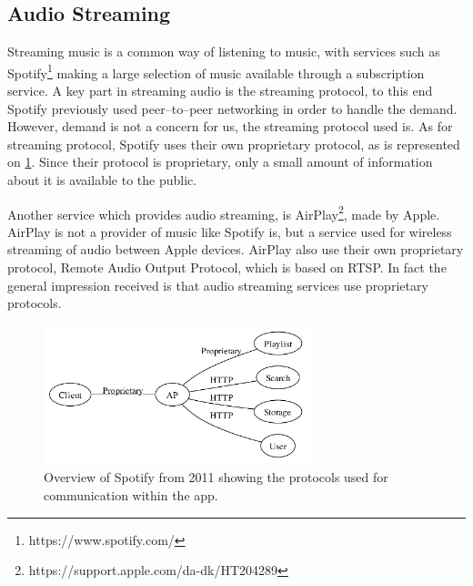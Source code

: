 \subsection{Audio Streaming}
Streaming music is a common way of listening to music, with services such as Spotify\footnote{https://www.spotify.com/} making a large selection of music available through a subscription service.
A key part in streaming audio is the streaming protocol, to this end Spotify previously used peer--to--peer networking in order to handle the demand.\cite{spotify1}
However, demand is not a concern for us, the streaming protocol used is.
As for streaming protocol, Spotify uses their own proprietary protocol, as is represented on \cref{fig:spotifyOverview}.\cite{spotifySlides} %
Since their protocol is proprietary, only a small amount of information about it is available to the public.

Another service which provides audio streaming, is AirPlay\footnote{https://support.apple.com/da-dk/HT204289}, made by Apple.
AirPlay is not a provider of music like Spotify is, but a service used for wireless streaming of audio between Apple devices.
AirPlay also use their own proprietary protocol, Remote Audio Output Protocol, which is based on \ac{RTSP}.
In fact the general impression received is that audio streaming services use proprietary protocols.

\begin{figure}[!bht]
    \centering
    \includegraphics[width=0.7\textwidth]{img/spotifyOverview.png}
    \caption{Overview of Spotify from 2011 showing the protocols used for communication within the app.\cite{spotifySlides}}
    \label{fig:spotifyOverview}
\end{figure}


